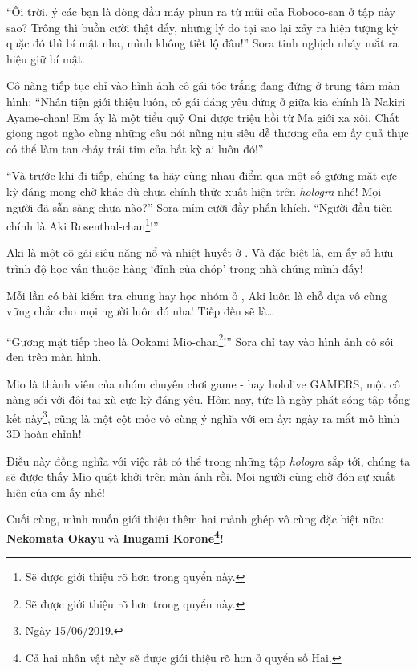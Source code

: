\documentclass[../main.tex]{subfiles}
\begin{document}
``Ôi trời, ý các bạn là dòng dầu máy phun ra từ mũi của Roboco-san ở tập này sao? Trông thì buồn cười thật đấy, nhưng lý do tại sao lại xảy ra hiện tượng kỳ quặc đó thì bí mật nha, mình không tiết lộ đâu!'' Sora tinh nghịch nháy mắt ra hiệu giữ bí mật.


Cô nàng tiếp tục chỉ vào hình ảnh cô gái tóc trắng đang đứng ở trung tâm màn hình: ``Nhân tiện giới thiệu luôn, cô gái đáng yêu đứng ở giữa kia chính là Nakiri Ayame-chan! Em ấy là một tiểu quỷ Oni được triệu hồi từ Ma giới xa xôi. Chất giọng ngọt ngào cùng những câu nói nũng nịu siêu dễ thương của em ấy quả thực có thể làm tan chảy trái tim của bất kỳ ai luôn đó!''

\il

``Và trước khi đi tiếp, chúng ta hãy cùng nhau điểm qua một số gương mặt cực kỳ đáng mong chờ khác dù chưa chính thức xuất hiện trên \textit{hologra} nhé! Mọi người đã sẵn sàng chưa nào?'' Sora mỉm cười đầy phấn khích. ``Người đầu tiên chính là Aki Rosenthal-chan\footnote{Sẽ được giới thiệu rõ hơn {} trong quyển này.}!''

Aki là một cô gái siêu năng nổ và nhiệt huyết ở \hll. Và đặc biệt là, em ấy sở hữu trình độ học vấn thuộc hàng `đỉnh của chóp' trong nhà chúng mình đấy!


Mỗi lần có bài kiểm tra chung hay học nhóm ở \hll, Aki luôn là chỗ dựa vô cùng vững chắc cho mọi người luôn đó nha! Tiếp đến sẽ là\dots

``Gương mặt tiếp theo là Ookami Mio-chan\footnote{Sẽ được giới thiệu rõ hơn {} trong quyển này.}!'' Sora chỉ tay vào hình ảnh cô sói đen trên màn hình.

Mio là thành viên của nhóm chuyên chơi game - hay hololive GAMERS, một cô nàng sói với đôi tai xù cực kỳ đáng yêu. Hôm nay, tức là ngày phát sóng tập tổng kết này\footnote{Ngày 15/06/2019.}, cũng là một cột mốc vô cùng ý nghĩa với em ấy: ngày ra mắt mô hình 3D hoàn chỉnh!


Điều này đồng nghĩa với việc rất có thể trong những tập \textit{hologra} sắp tới, chúng ta sẽ được thấy Mio quật khởi trên màn ảnh rồi. Mọi người cùng chờ đón sự xuất hiện của em ấy nhé!

Cuối cùng, mình muốn giới thiệu thêm hai mảnh ghép vô cùng đặc biệt nữa: \textbf{Nekomata Okayu} và \textbf{Inugami Korone\footnote{Cả hai nhân vật này sẽ được giới thiệu rõ hơn ở quyển số Hai.}!}
\end{document}

